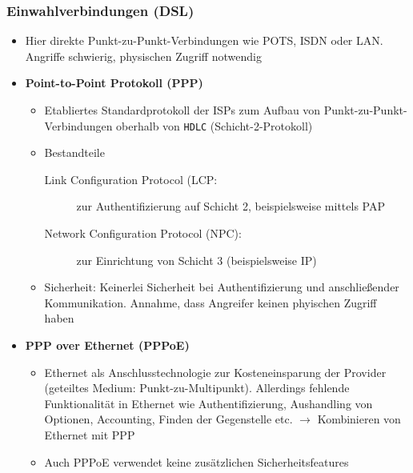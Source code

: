 \subsubsection{Einwahlverbindungen (DSL)}
\begin{itemize}
	\item Hier direkte Punkt-zu-Punkt-Verbindungen wie POTS, ISDN oder LAN. Angriffe schwierig, physischen Zugriff notwendig
	\item \textbf{Point-to-Point Protokoll (PPP)}
	\begin{itemize}
		\item Etabliertes Standardprotokoll der ISPs zum Aufbau von Punkt-zu-Punkt-Verbindungen oberhalb von \texttt{HDLC} (Schicht-2-Protokoll)
		\item Bestandteile
		\begin{description}
			\item[Link Configuration Protocol (LCP:] zur Authentifizierung auf Schicht 2, beispielsweise mittels PAP
			\item[Network Configuration Protocol (NPC):] zur Einrichtung von Schicht 3 (beispielsweise IP)
		\end{description}
		\item Sicherheit: Keinerlei Sicherheit bei Authentifizierung und anschließender Kommunikation. Annahme, dass Angreifer keinen phyischen Zugriff haben
	\end{itemize}
	\item \textbf{PPP over Ethernet (PPPoE)}
	\begin{itemize}
		\item Ethernet als Anschlusstechnologie zur Kosteneinsparung der Provider (geteiltes Medium: Punkt-zu-Multipunkt). Allerdings fehlende Funktionalität in Ethernet wie Authentifizierung, Aushandling von Optionen, Accounting, Finden der Gegenstelle etc. \(\rightarrow\) Kombinieren von Ethernet mit PPP
		\item Auch PPPoE verwendet keine zusätzlichen Sicherheitsfeatures
	\end{itemize}
\end{itemize}

